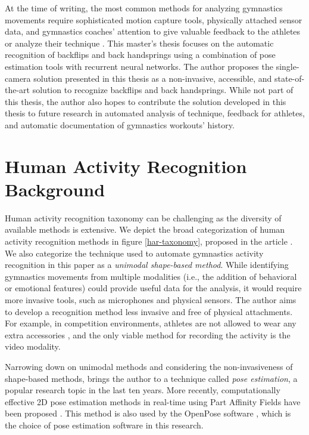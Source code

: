 At the time of writing, the most common methods for analyzing gymnastics movements require sophisticated motion capture tools, physically attached sensor data, and gymnastics coaches' attention to give valuable feedback to the athletes or analyze their technique \cite{park2014kinematic} \cite{yamada2019dynamics}. This master's thesis focuses on the automatic recognition of backflips and back handsprings using a combination of pose estimation tools with recurrent neural networks. The author proposes the single-camera solution presented in this thesis as a non-invasive, accessible, and state-of-the-art solution to recognize backflips and back handsprings. While not part of this thesis, the author also hopes to contribute the solution developed in this thesis to future research in automated analysis of technique, feedback for athletes, and automatic documentation of gymnastics workouts' history.

\section{Human Activity Recognition Background}

Human activity recognition taxonomy can be challenging as the diversity of available methods is extensive. We depict the broad categorization of human activity recognition methods in figure \ref{har-taxonomy}, proposed in the article \cite{10.3389/frobt.2015.00028}. We also categorize the technique used to automate gymnastics activity recognition in this paper as a \textit{unimodal shape-based method}. While identifying gymnastics movements from multiple modalities (i.e., the addition of behavioral or emotional features) could provide useful data for the analysis, it would require more invasive tools, such as microphones and physical sensors. The author aims to develop a recognition method less invasive and free of physical attachments. For example, in competition environments, athletes are not allowed to wear any extra accessories \cite{acrobatic-gymnastics-rules-and-policies}, and the only viable method for recording the activity is the video modality. 

Narrowing down on unimodal methods and considering the non-invasiveness of shape-based methods, brings the author to a technique called \textit{pose estimation}, a popular research topic in the last ten years. More recently, computationally effective 2D pose estimation methods in real-time using Part Affinity Fields have been proposed \cite{DBLP:journals/corr/CaoSWS16}. This method is also used by the OpenPose software \cite{DBLP:journals/corr/abs-1812-08008}, which is the choice of pose estimation software in this research. 


